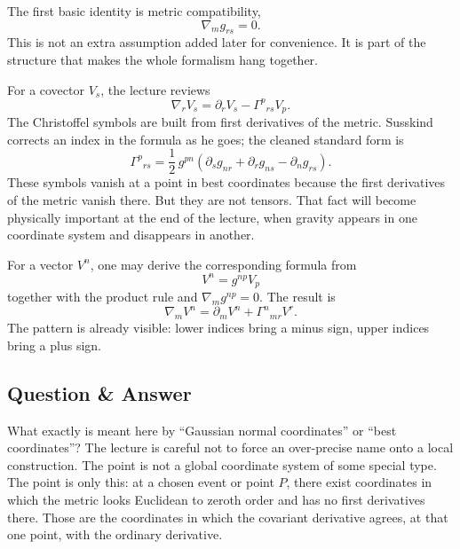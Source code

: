 The first basic identity is metric compatibility,
\begin{equation}
\nabla_m g_{rs}=0.
\end{equation}
This is not an extra assumption added later for convenience. It is part of the structure that makes the whole formalism hang together.

For a covector \(V_s\), the lecture reviews
\begin{equation}
\nabla_r V_s=\partial_r V_s-\Gamma^{p}{}_{rs}V_p.
\end{equation}
The Christoffel symbols are built from first derivatives of the metric. Susskind corrects an index in the formula as he goes; the cleaned standard form is
\begin{equation}
\Gamma^{p}{}_{rs}
=
\frac{1}{2}\,
g^{pn}
\left(
\partial_s g_{nr}
+\partial_r g_{ns}
-\partial_n g_{rs}
\right).
\end{equation}
These symbols vanish at a point in best coordinates because the first derivatives of the metric vanish there. But they are not tensors. That fact will become physically important at the end of the lecture, when gravity appears in one coordinate system and disappears in another.

For a vector \(V^n\), one may derive the corresponding formula from
\begin{equation}
V^n=g^{np}V_p
\end{equation}
together with the product rule and \(\nabla_m g^{np}=0\). The result is
\begin{equation}
\nabla_m V^n=\partial_m V^n+\Gamma^{n}{}_{mr}V^r.
\end{equation}
The pattern is already visible: lower indices bring a minus sign, upper indices bring a plus sign.

\subsection{Question \& Answer}

What exactly is meant here by ``Gaussian normal coordinates'' or ``best coordinates''? The lecture is careful not to force an over-precise name onto a local construction. The point is not a global coordinate system of some special type. The point is only this: at a chosen event or point \(P\), there exist coordinates in which the metric looks Euclidean to zeroth order and has no first derivatives there. Those are the coordinates in which the covariant derivative agrees, at that one point, with the ordinary derivative.

